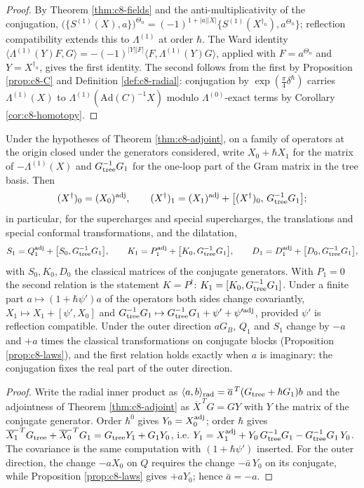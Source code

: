 \begin{proof}
By Theorem \ref{thm:c8-fields} and the anti-multiplicativity of the conjugation, $\big(\{S^{(1)}(X),a\}\big)^{\Theta_n}=(-1)^{1+|a||X|}\{S^{(1)}(X^{\dagger_n}),a^{\Theta_n}\}$; reflection compatibility extends this to $\Lambda^{(1)}$ at order $\hbar$. The Ward identity $\langle\Lambda^{(1)}(Y)F,G\rangle=-(-1)^{|Y||F|}\langle F,\Lambda^{(1)}(Y)G\rangle$, applied with $F=a^{\Theta_n}$ and $Y=X^{\dagger_n}$, gives the first identity. The second follows from the first by Proposition \ref{prop:c8-C} and Definition \ref{def:c8-radial}: conjugation by $\exp(\tfrac\pi4\delta^\hbar)$ carries $\Lambda^{(1)}(X)$ to $\Lambda^{(1)}(\mathrm{Ad}(C)^{-1}X)$ modulo $\Lambda^{(0)}$-exact terms by Corollary \ref{cor:c8-homotopy}.
\end{proof}

\begin{corollary}[The test $Q^\dagger=S$ in Gram form]
\label{cor:c8-gram}
Under the hypotheses of Theorem \ref{thm:c8-adjoint}, on a family of operators at the origin closed under the generators considered, write $X_0+\hbar X_1$ for the matrix of $-\Lambda^{(1)}(X)$ and $G_{\rm tree}^{-1}G_1$ for the one-loop part of the Gram matrix in the tree basis. Then
\[
(X^\dagger)_0=(X_0)^{\rm adj},\qquad (X^\dagger)_1=(X_1)^{\rm adj}+\big[(X^\dagger)_0,\,G_{\rm tree}^{-1}G_1\big];
\]
in particular, for the supercharges and special supercharges, the translations and special conformal transformations, and the dilatation,
\[
S_1=Q_1^{\rm adj}+\big[S_0,G_{\rm tree}^{-1}G_1\big],\qquad K_1=P_1^{\rm adj}+\big[K_0,G_{\rm tree}^{-1}G_1\big],\qquad D_1=D_1^{\rm adj}+\big[D_0,G_{\rm tree}^{-1}G_1\big],
\]
with $S_0,K_0,D_0$ the classical matrices of the conjugate generators. With $P_1=0$ the second relation is the statement $K=P^\dagger$: $K_1=[K_0,G_{\rm tree}^{-1}G_1]$. Under a finite part $a\mapsto(1+\hbar\psi')a$ of the operators both sides change covariantly, $X_1\mapsto X_1+[\psi',X_0]$ and $G_{\rm tree}^{-1}G_1\mapsto G_{\rm tree}^{-1}G_1+\psi'+\psi'^{\rm adj}$, provided $\psi'$ is reflection compatible. Under the outer direction $aG_B$, $Q_1$ and $S_1$ change by $-a$ and $+a$ times the classical transformations on conjugate blocks (Proposition \ref{prop:c8-laws}), and the first relation holds exactly when $a$ is imaginary: the conjugation fixes the real part of the outer direction.
\end{corollary}

\begin{proof}
Write the radial inner product as $\langle a,b\rangle_{\rm rad}=\overline a^{\,T}(G_{\rm tree}+\hbar G_1)b$ and the adjointness of Theorem \ref{thm:c8-adjoint} as $\overline{X}^{\,T}G=GY$ with $Y$ the matrix of the conjugate generator. Order $\hbar^0$ gives $Y_0=X_0^{\rm adj}$; order $\hbar$ gives $\overline{X_1}^{\,T}G_{\rm tree}+\overline{X_0}^{\,T}G_1=G_{\rm tree}Y_1+G_1Y_0$, i.e. $Y_1=X_1^{\rm adj}+Y_0\,G_{\rm tree}^{-1}G_1-G_{\rm tree}^{-1}G_1\,Y_0$. The covariance is the same computation with $(1+\hbar\psi')$ inserted. For the outer direction, the change $-aX_0$ on $Q$ requires the change $-\bar a\,Y_0$ on its conjugate, while Proposition \ref{prop:c8-laws} gives $+aY_0$; hence $\bar a=-a$.
\end{proof}

